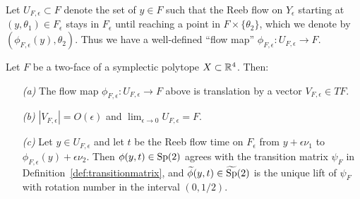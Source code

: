 Let $U_{F,\epsilon}\subset F$ denote the set of $y\in F$ such that the Reeb flow on $Y_\epsilon$ starting at $(y,\theta_1)\in F_\epsilon$ stays in $F_\epsilon$ until reaching a point in $F\times\{\theta_2\}$, which we denote by $(\phi_{F,\epsilon}(y),\theta_2)$. Thus we have a well-defined ``flow map'' $\phi_{F,\epsilon}: U_{F,\epsilon}\to F$.

\begin{lemma}
\label{lem:stf}
Let $F$ be a two-face of a symplectic polytope $X\subset {\mathbb R}^4$. Then:
\begin{itemize}
\item[\emph{(a)}] The flow map $\phi_{F,\epsilon}:U_{F,\epsilon}\to F$ above is translation by a vector $V_{F,\epsilon}\in TF$.
\item[\emph{(b)}]
$|V_{F,\epsilon}|=O(\epsilon)$ and $\lim_{\epsilon\to 0}U_{F,\epsilon}=F$.
\item[\emph{(c)}]
Let $y\in U_{F,\epsilon}$ and let $t$ be the Reeb flow time on $F_\epsilon$ from $y+\epsilon\nu_1$ to $\phi_{F,\epsilon}(y)+\epsilon\nu_2$. Then $\phi(y,t)\in\operatorname{Sp}(2)$ agrees with the transition matrix $\psi_F$ in Definition~\ref{def:transitionmatrix}, and $\widetilde{\phi}(y,t)\in\widetilde{\operatorname{Sp}}(2)$ is the unique lift of $\psi_F$ with rotation number in the interval $(0,1/2)$.
\end{itemize}
\end{lemma}

